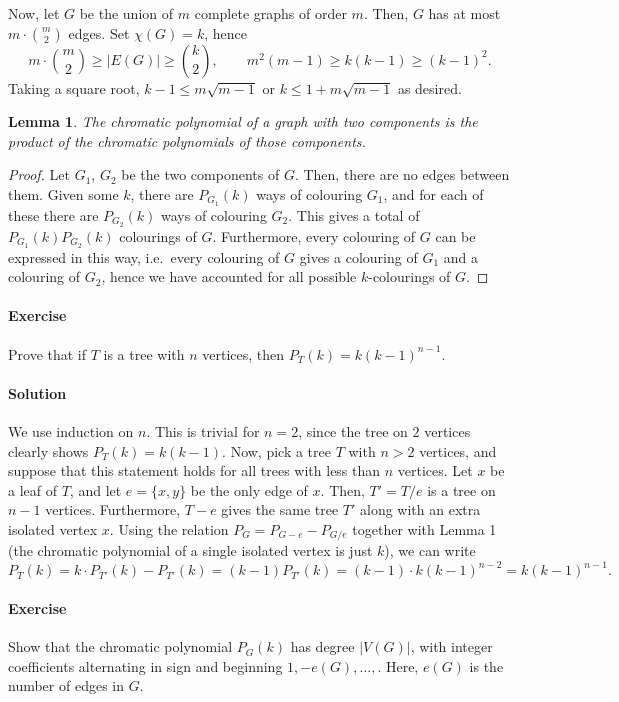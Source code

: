 \documentclass[10pt]{article}
\newcounter{prob}
\newcommand{\problem}{\stepcounter{prob}\paragraph{Exercise \arabic{prob}}}
\newcommand{\solution}{\paragraph{Solution}}
\newtheorem{lemma}{Lemma}
\begin{document}
    Now, let $G$ be the union of $m$ complete graphs of order $m$. Then, $G$ has at
    most $m \cdot \binom{m}{2}$ edges. Set $\chi(G) = k$, hence \[
        m\cdot \binom{m}{2} \geq |E(G)| \geq \binom{k}{2}, \qquad 
        m^2(m - 1) \geq k(k - 1) \geq (k - 1)^2.
    \] Taking a square root, $k - 1 \leq m\sqrt{m - 1}$ or $k \leq 1 + m\sqrt{m - 1}$
    as desired. \\


    \begin{lemma}
        The chromatic polynomial of a graph with two components is the product of the
        chromatic polynomials of those components.
    \end{lemma}
    \begin{proof}
        Let $G_1$, $G_2$ be the two components of $G$. Then, there are no edges
        between them. Given some $k$, there are $P_{G_1}(k)$ ways of colouring $G_1$,
        and for each of these there are $P_{G_2}(k)$ ways of colouring $G_2$. This
        gives a total of $P_{G_1}(k)P_{G_2}(k)$ colourings of $G$. Furthermore, every
        colouring of $G$ can be expressed in this way, i.e.\ every colouring of $G$
        gives a colouring of $G_1$ and a colouring of $G_2$, hence we have accounted
        for all possible $k$-colourings of $G$.
    \end{proof}


    \problem Prove that if $T$ is a tree with $n$ vertices, then $P_T(k) = k(k -
    1)^{n - 1}$.

    \solution We use induction on $n$. This is trivial for $n = 2$, since the tree on
    $2$ vertices clearly shows $P_T(k) = k(k - 1)$. Now, pick a tree $T$ with $n > 2$
    vertices, and suppose that this statement holds for all trees with less than $n$
    vertices. Let $x$ be a leaf of $T$, and let $e = \{x, y\}$ be the only edge of
    $x$. Then, $T' = T / e$ is a tree on $n - 1$ vertices. Furthermore, $T - e$ gives
    the same tree $T'$ along with an extra isolated vertex $x$. Using the relation
    $P_{G} = P_{G - e} - P_{G/e}$ together with Lemma 1 (the chromatic polynomial of
    a single isolated vertex is just $k$), we can write \[
        P_T(k) = k \cdot P_{T'}(k) - P_{T'}(k) = (k - 1)P_{T'}(k) = (k - 1)\cdot k(k
        - 1)^{n - 2} = k(k - 1)^{n - 1}.
    \] 


    \problem Show that the chromatic polynomial $P_G(k)$ has degree $|V(G)|$, with
    integer coefficients alternating in sign and beginning $1, -e(G), \dots, $. Here,
    $e(G)$ is the number of edges in $G$.
\end{document}
